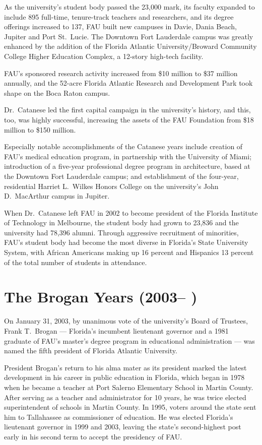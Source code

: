 \documentclass{article}
\begin{document}
As the university's student body passed the 23,000 mark, its faculty expanded to include 895 full-time, tenure-track teachers and researchers, and its degree offerings increased to 137, FAU built new campuses in Davie, Dania Beach, Jupiter and Port St.\ Lucie.  The Downtown Fort Lauderdale campus was greatly enhanced by the addition of the Florida Atlantic University/Broward Community College Higher Education Complex, a 12-story high-tech facility.

FAU's sponsored research activity increased from \$10 million to \$37 million annually, and the 52-acre Florida Atlantic Research and Development Park took shape on the Boca Raton campus.

Dr.\ Catanese led the first capital campaign in the university's history, and this, too, was highly successful, increasing the assets of the FAU Foundation from \$18 million to \$150 million.

Especially notable accomplishments of the Catanese years include creation of FAU's medical education program, in partnership with the University of Miami; introduction of a five-year professional degree program in architecture, based at the Downtown Fort Lauderdale campus; and establishment of the four-year, residential Harriet L.\ Wilkes Honors College on the university's John D.\ MacArthur campus in Jupiter.

When Dr.\ Catanese left FAU in 2002 to become president of the Florida Institute of Technology in Melbourne, the student body had grown to 23,836 and the university had 78,396 alumni.  Through aggressive recruitment of minorities, FAU's student body had become the most diverse in Florida's State University System, with African Americans making up 16 percent and Hispanics 13 percent of the total number of students in attendance.

\section{The Brogan Years (2003-- )}

On January 31, 2003, by unanimous vote of the university's Board of Trustees, Frank T.\ Brogan --- Florida's incumbent lieutenant governor and a 1981 graduate of FAU's master's degree program in educational administration --- was named the fifth president of Florida Atlantic University.

President Brogan's return to his alma mater as its president marked the latest development in his career in public education in Florida, which began in 1978 when he became a teacher at Port Salerno Elementary School in Martin County.  After serving as a teacher and administrator for 10 years, he was twice elected superintendent of schools in Martin County.  In 1995, voters around the state sent him to Tallahassee as commissioner of education.  He was elected Florida's lieutenant governor in 1999 and 2003, leaving the state's second-highest post early in his second term to accept the presidency of FAU.
\end{document}
